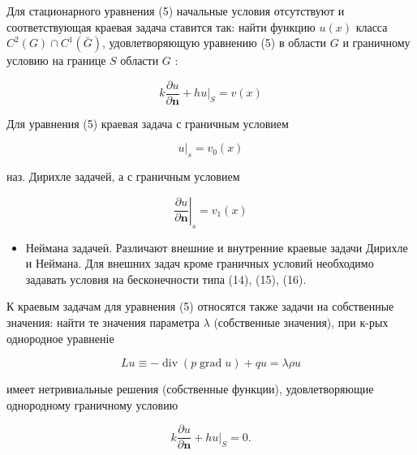 \documentclass[10pt]{article}
\begin{document}
Для стационарного уравнения (5) начальные условия отсутствуют и соответствующая краевая задача ставится так: найти функцию $u(x)$ класса $C^{2}(G) \cap C^{1}(\bar{G})$, удовлетворяющую уравнению (5) в области $G$ и граничному условию на границе $S$ области $G$ :



\[

k \frac{\partial u}{\partial \boldsymbol{n}}+\left.h u\right|_{S}=v(x)

\]



Для уравнения (5) краевая задача с граничным условием



\[

\left.u\right|_{s}=v_{0}(x)

\]



наз. Дирихле задачей, а с граничным условием



\[

\left.\frac{\partial u}{\partial \boldsymbol{n}}\right|_{s}=v_{1}(x)

\]



\begin{itemize}

  \item Неймана задачеӥ. Различают внешние и внутренние краевые задачи Дирихле и Неймана. Для внешних задач кроме граничных условий необходимо задавать условия на бесконечности типа (14), (15), (16).

\end{itemize}



К краевым задачам для уравнения (5) относятся также задачи на собственные значения: найти те значения параметра $\lambda$ (собственные значения), при к-рых однородное уравненіе



\[

L u \equiv-\operatorname{div}(p \operatorname{grad} u)+q u=\lambda \rho u

\]



имеет нетривиальные решения (собственные функции), удовлетворяющие однородному граничному условию



\[

k \frac{\partial u}{\partial \boldsymbol{n}}+\left.h u\right|_{S}=0 .

\]
\end{document}
